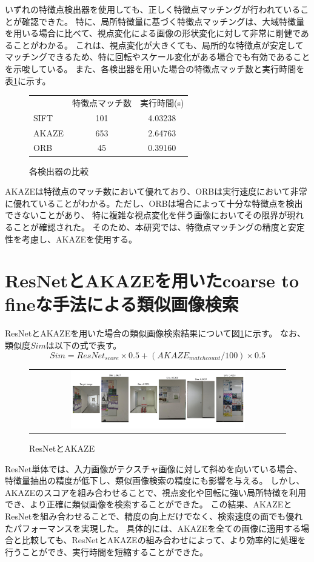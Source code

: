 \documentclass[]{jarticle}          %
\begin{document}
いずれの特徴点検出器を使用しても、正しく特徴点マッチングが行われていることが確認できた。
特に、局所特徴量に基づく特徴点マッチングは、大域特徴量を用いる場合に比べて、視点変化による画像の形状変化に対して非常に剛健であることがわかる。
これは、視点変化が大きくても、局所的な特徴点が安定してマッチングできるため、特に回転やスケール変化がある場合でも有効であることを示唆している。
また、各検出器を用いた場合の特徴点マッチ数と実行時間を表\ref{three}に示す。
\begin{figure}[H]
  \begin{center}
    \begin{tabular}{lcc}
    & 特徴点マッチ数 & 実行時間(s) \\
    SIFT & 101 & 4.03238 \\
    AKAZE & 653 & 2.64763 \\
    ORB & 45 & 0.39160
    \end{tabular}
  \end{center}
  \caption{各検出器の比較}
  \label{three}
\end{figure}
AKAZEは特徴点のマッチ数において優れており、ORBは実行速度において非常に優れていることがわかる。ただし、ORBは場合によって十分な特徴点を検出できないことがあり、
特に複雑な視点変化を伴う画像においてその限界が現れることが確認された。
そのため、本研究では、特徴点マッチングの精度と安定性を考慮し、AKAZEを使用する。

\section{ResNetとAKAZEを用いたcoarse to fineな手法による類似画像検索}
ResNetとAKAZEを用いた場合の類似画像検索結果について図\ref{three}に示す。
なお、類似度$Sim$は以下の式で表す。
\begin{equation}
  Sim = ResNet_{score}\times{0.5}+(AKAZE_{matchcount}/100)\times{0.5}
\end{equation}
\begin{figure}[H]
  \begin{center}
    \begin{tabular}{c}
      \includegraphics[width=0.7\textwidth]{figures/RasNet_AKAZE330.png}\\
    \end{tabular}
  \end{center}
  \caption{ResNetとAKAZE}
  \label{four}
\end{figure}
ResNet単体では、入力画像がテクスチャ画像に対して斜めを向いている場合、特徴量抽出の精度が低下し、類似画像検索の精度にも影響を与える。
しかし、AKAZEのスコアを組み合わせることで、視点変化や回転に強い局所特徴を利用でき、より正確に類似画像を検索することができた。
この結果、AKAZEとResNetを組み合わせることで、精度の向上だけでなく、検索速度の面でも優れたパフォーマンスを実現した。
具体的には、AKAZEを全ての画像に適用する場合と比較しても、ResNetとAKAZEの組み合わせによって、より効率的に処理を行うことができ、実行時間を短縮することができた。
\end{document}
